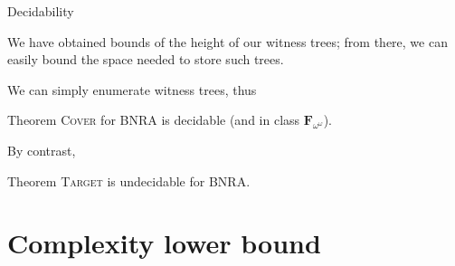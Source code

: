 \documentclass{beamer}
\newcommand{\COVER}{\textsc{Cover}\xspace}
\newcommand{\TARGET}{\textsc{Target}\xspace}
\begin{document}
				
				
		
			
				
				
			
	

\begin{frame}{Decidability}
	
	We have obtained bounds of the height of our witness trees; from there, we can easily bound the space needed to store such trees.
	
	\pause
	We can simply enumerate witness trees, thus
	
	\begin{block}{Theorem}
		{\COVER} for BNRA is decidable (and in class $\mathbf{F}_{\omega^\omega}$).
	\end{block}
	
	\pause
	
	By contrast,
	
	\begin{block}{Theorem}
		{\TARGET} is undecidable for BNRA.
	\end{block}
\end{frame}

\section{Complexity lower bound}
\end{document}
